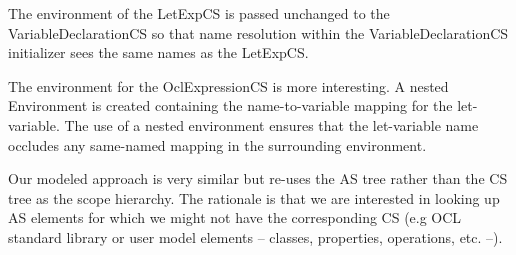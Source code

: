 \documentclass{llncs}
\begin{document}
The environment of the LetExpCS is passed unchanged to the VariableDeclarationCS so that name resolution within the VariableDeclarationCS initializer sees the same names as the LetExpCS.

The environment for the OclExpressionCS is more interesting. A nested Environment is created containing the name-to-variable mapping for the let-variable. The use of a nested environment ensures that the let-variable name occludes any same-named mapping in the surrounding environment.



Our modeled approach is very similar but re-uses the AS tree rather than the CS tree as the scope hierarchy. 
The rationale is that we are interested in looking up AS elements for which we might not have the corresponding CS (e.g OCL standard library or user model elements -- classes, properties, operations, etc. --).


\end{document}
